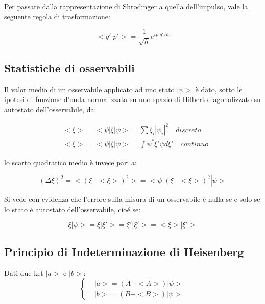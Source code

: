 \documentclass{article}
\begin{document}
Per passare dalla rappresentazione di Shrodinger a quella dell'impulso, vale la seguente regola di trasformazione:

\begin{equation}
    <q'|p'>= \frac{1}{\sqrt{h}}e^{ip'q'/\hbar}
\end{equation}

\subsection{Statistiche di osservabili}
Il valor medio di un osservabile applicato ad uno stato $|\psi>$ è dato, sotto le ipotesi di funzione d'onda normalizzata su uno spazio di Hilbert diagonalizzato su autostato dell'osservabile, da:

\begin{equation}
    \begin{aligned}
         & <\xi>= <\psi|\xi|\psi>= \sum \xi_i |\psi_i|^2 \quad discreto     \\
         & <\xi>= <\psi|\xi|\psi>= \int \psi^*\xi'\psi d\xi' \quad continuo
    \end{aligned}
\end{equation}

lo scarto quadratico medio è invece pari a:

\begin{equation}
    (\Delta \xi)^2=<(\xi-<\xi>)^2>= <\psi|(\xi-<\xi>)^2|\psi>
\end{equation}

Si vede con evidenza che l'errore sulla misura di un osservabile è nulla se e solo se lo stato è autostato dell'osservabile, cioé se:

\begin{equation}
    \xi |\psi>= \xi |\xi'>= \xi' |\xi'>= <\xi>|\xi'>
\end{equation}




\subsection{Principio di Indeterminazione di Heisenberg}
Dati due ket $|a>$ e $|b>$:
\begin{equation}
    \left\{
    \begin{aligned}
         & |a>=(A-<A>)|\psi> \\
         & |b>=(B-<B>)|\psi>
    \end{aligned}
    \right.
\end{equation}
\end{document}
